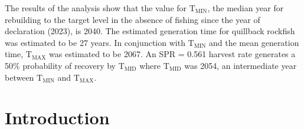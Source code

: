 \documentclass[11pt,
  english,
  a4paper,
]{article}
\begin{document}
\leavevmode\tagmcend\tagstructend\par


The results of the analysis show that the value for {\(\text{T}_\text{MIN}\)\leavevmode\tagmcend\tagstructend}, the median year for rebuilding to the target level in the absence of fishing since the year of declaration (2023), is 2040. The estimated generation time for quillback rockfish was estimated to be 27 years. In conjunction with {\(\text{T}_\text{MIN}\)\leavevmode\tagmcend\tagstructend} and the mean generation time, {\(\text{T}_\text{MAX}\)\leavevmode\tagmcend\tagstructend} was estimated to be 2067. An SPR = 0.561 harvest rate generates a 50\% probability of recovery by {\(\text{T}_\text{MID}\)\leavevmode\tagmcend\tagstructend} where {\(\text{T}_\text{MID}\)\leavevmode\tagmcend\tagstructend} was 2054, an intermediate year between {\(\text{T}_\text{MIN}\)\leavevmode\tagmcend\tagstructend} and {\(\text{T}_\text{MAX}\)\leavevmode\tagmcend\tagstructend}.

\leavevmode\tagmcend\tagstructend\par

\pagebreak
\setlength{\parskip}{5mm plus1mm minus1mm}
\setcounter{page}{1}
\renewcommand{\thefigure}{\arabic{figure}}
\renewcommand{\thetable}{\arabic{table}}
\setcounter{table}{0}
\setcounter{figure}{0}

\setlength\parskip{0.2em plus 0.1em minus 0.2em}


\hypertarget{introduction}{%
\section{Introduction}\label{introduction}}

\leavevmode\tagmcend\tagstructend

\end{document}
